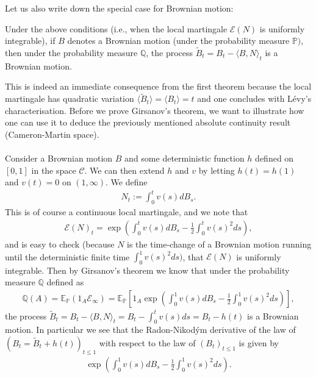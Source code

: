 \documentclass[../mainfile.tex]{subfiles}
\begin{document}
Let us also write down the special case for Brownian motion:
\begin{thm} Under the above conditions (i.e., when the local martingale $\mathcal{E}(N)$ is uniformly integrable), if $B$ denotes a Brownian motion (under the probability measure $\mathbb{P})$, then under the probability measure $\mathbb{Q}$, the process $\tilde{B}_t= B_t- \langle B,N \rangle_t$ is a Brownian motion. 
\end{thm}
This is indeed an immediate consequence from the first theorem because the local martingale has quadratic variation $\langle \tilde{B}_t \rangle = \langle B_t \rangle = t$ and one concludes with Lévy's characterisation. 
\newpage
Before we prove Girsanov's theorem,  we want to illustrate how one can use it to deduce the previously mentioned absolute continuity result (Cameron-Martin space). 
\\\\
Consider a Brownian motion $B$ and some deterministic function $h$ defined on $[0,1]$ in the space $\mathcal{C}$. We can then extend $h$ and $v$ by letting $h(t)=h(1)$ and $v(t)=0$ on $(1, \infty)$. We define
\begin{align*}
N_t:= \int_0^t v(s) dB_s.
\end{align*}
This is of course  a continuous local martingale, and we note that
\begin{align*}
\mathcal{E}(N)_t = \exp \left( \int_0^t v(s) dB_s - \frac{1}{2} \int_0^t v(s)^2 ds \right),
\end{align*}
and is easy to check (because $N$ is the time-change of a Brownian motion running until the deterministic finite time $\int_0^1 v(s)^2ds)$, that $\mathcal{E}(N)$ is uniformly integrable. Then by Girsanov's theorem we know that under the probability measure $\mathbb{Q}$ defined as 
\begin{align*}
\mathbb{Q}(A) = \mathbb{E}_\mathbb{P}(1_A \mathcal{E}_\infty) = \mathbb{E}_\mathbb{P}\left[ 1_A \exp \left(\int_0^1 v(s)dB_s - \frac{1}{2} \int_0^1 v(s)^2 ds \right) \right],
\end{align*}
the process $\tilde{B}_t=B_t- \langle B,N\rangle_t= B_t- \int_0^t v(s)ds=B_t-h(t)$ is a Brownian motion.  In particular we see that the Radon-Nikodým derivative of the law of $(B_t= \tilde{B}_t + h(t))_{t \leq 1}$ with respect to the law of $(B_t)_{t \leq 1}$ is given by 
\begin{align*}
\exp \left( \int_0^1 v(s) dB_s - \frac{1}{2} \int_0^1 v(s)^2 ds \right).
\end{align*} 
\end{document}
